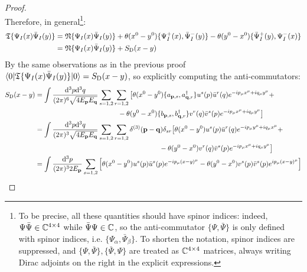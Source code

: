 \begin{proofbox}
\begin{proof}
\begin{equation*}
    \end{equation*}
    Therefore, in general\footnote{To be precise, all these quantities should have spinor indices: indeed, $ \Psi \bar{\Psi} \in \mathbb{C}^{4 \times 4} $ while $ \bar{\Psi} \Psi \in \mathbb{C} $, so the anti-commutator $ \{\Psi , \bar{\Psi}\} $ is only defined with spinor indices, i.e. $ \{\Psi_\alpha , \bar{\Psi}_\beta\} $. To shorten the notation, spinor indices are suppressed, and $ \{\Psi , \bar{\Psi}\} , \{\bar{\Psi} , \Psi\} $ are treated as $ \mathbb{C}^{4 \times 4} $ matrices, always writing Dirac adjoints on the right in the explicit expressions.}:
    \begin{equation*}
      \begin{split}
        \mathfrak{T}\{\Psi_I(x) \bar{\Psi}_I(y)\}
        & = \mathfrak{N}\{\Psi_I(x) \bar{\Psi}_I(y)\} + \theta(x^0 - y^0) \{\Psi_I^+(x) , \bar{\Psi}_I^-(y)\} - \theta(y^0 - x^0) \{\bar{\Psi}_I^+(y) , \Psi_I^-(x)\} \\
        & = \mathfrak{N}\{\Psi_I(x) \bar{\Psi}_I(y)\} + S_\text{D}(x - y)
      \end{split}
    \end{equation*}
    By the same observations as in the previous proof $ \braket{0 | \mathfrak{T}\{\Psi_I(x) \bar{\Psi}_I(y)\} | 0} = S_\text{D}(x - y) $, so explicitly computing the anti-commutators:
    \begin{equation*}
      \begin{split}
        S_\text{D}(x - y)
        & = \int \frac{\dd^3p \dd^3q}{(2\pi)^6 \sqrt{4E_\ve{p}E_\ve{q}}} \sum_{s = 1,2} \sum_{r = 1,2} \big[ \theta(x^0 - y^0) \{a_{\ve{p},s} , a_{\ve{q},r}\dg\} u^s(p) \bar{u}^r(q) e^{-i p_\mu x^\mu + i q_\mu y^\mu} + \\
        & \qquad \qquad \qquad \qquad \qquad \qquad - \theta(y^0 - x^0) \{b_{\ve{p},s} , b_{\ve{q},r}\dg\} v^r(q) \bar{v}^s(p) e^{-i p_\mu x^\mu + i q_\mu y^\mu} \big] \\
        & = \int \frac{\dd^3p \dd^3q}{(2\pi)^3 \sqrt{4E_\ve{p}E_\ve{q}}} \sum_{s = 1,2} \sum_{r = 1,2} \delta^{(3)}(\ve{p} - \ve{q}) \delta_{sr} \big[ \theta(x^0 - y^0) u^s(p) \bar{u}^r(q) e^{-i p_\mu y^\mu + i q_\mu x^\mu} + \\
        & \qquad \qquad \qquad \qquad \qquad \qquad \qquad \qquad \qquad - \theta(y^0 - x^0) v^r(q) \bar{v}^s(p) e^{-i p_\mu x^\mu + i q_\mu y^\mu} \big] \\
        & = \int \frac{\dd^3p}{(2\pi)^3 2E_\ve{p}} \sum_{s = 1,2} \left[ \theta(x^0 - y^0) u^s(p) \bar{u}^s(p) e^{-i p_\mu (x-y)^\mu} - \theta(y^0 - x^0) v^s(p) \bar{v}^s(p) e^{i p_\mu (x-y)^\mu} \right]

\end{split}
\end{equation*}
\end{proof}
\end{proofbox}
